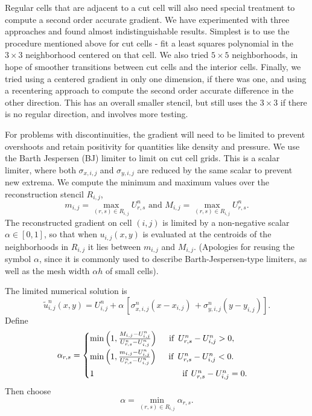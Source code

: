 Regular cells that are adjacent to a cut cell will also need special treatment to
compute a second order accurate gradient. We have experimented with three  approaches
and found almost indistinguishable results. Simplest is to use the 
procedure mentioned above for cut cells
- fit a least squares polynomial in the $3 \times 3$ neighborhood centered on that cell.
We also tried $5 \times 5$ neighborhoods, in hope of smoother transitions between cut cells
and the interior cells.  Finally, we tried using a centered
gradient in only one dimension, if there was one, and using a recentering approach to 
compute the second order accurate difference in the other direction.  This has an overall
smaller stencil, but still uses the $3 \times 3$ if there is no regular direction,
and involves more testing.  

For problems with discontinuities, the gradient will need to be limited
to prevent overshoots and retain positivity for quantities like density and
pressure.
We use the Barth Jespersen (BJ)  limiter \cite{barth-jespersen} to limit on 
cut cell grids. 
This is a scalar limiter, where both $\sigma_{x,i,j}$ and $\sigma_{y,i,j}$ 
are reduced by the same scalar to prevent new extrema.  
We compute the minimum and maximum values over the reconstruction 
stencil $R_{i,j}$, 
\begin{equation} 
m_{i,j} = \max_{(r,s) \in R_{i,j}} U^n_{r,s} \text{ and } 
M_{i,j} = \max_{(r,s) \in R_{i,j}} U^n_{r,s}.
\label{eqn:bj1}
\end{equation}
The reconstructed gradient on cell $(i,j)$ is limited by a non-negative 
scalar $\alpha \in [0,1]$, so that when ${u}_{i,j}(x,y)$ 
is evaluated at the centroids of the neighborhoods in $R_{i,j}$ it
lies between $m_{i,j}$ and $M_{i,j}$.
(Apologies for reusing the symbol $\alpha$, since it is commonly 
used to describe Barth-Jespersen-type limiters, as well as the 
mesh width $\alpha h$  of small cells).

The limited numerical solution is
\begin{equation}
     \tilde{u}^n_{i,j}(x,y) = U_{i,j}^n + \alpha \, [{\sigma}^n_{x,i,j} ( x -  x_{i,j}) \, 
   + {\sigma}^n_{y,i,j}( y -  y_{i,j})].
\end{equation}
Define
\begin{equation}\label{eq:bj_alpha}
    \alpha_{r,s} = \begin{cases}
           \min \left(1,\frac{M_{i,j}-U_{i,j}^n}{U^n_{r,s} - U_{i,j}^n} \right)
    \quad  \text{ if } \,   U_{r,s}^n - U_{i,j}^n >  0,\\[.08in]
            \min \left(1, \frac{m_{i,j}-U_{i,j}^n}{U^n_{r,s} - U_{i,j}^n} \right)  
    \quad  \text{ if }  \, U^n_{r,s} - U_{i,j}^n < 0.\\[.08in]
             1    \hspace*{1.45in}  \text{if} \; \, U^n_{r,s} - U_{i,j}^n = 0.
    \end{cases}
\end{equation}
Then choose
\begin{equation}\label{eqn:alpha}
\alpha = \min_{(r,s) \in R_{i,j}} \alpha_{r,s} .
\end{equation}

